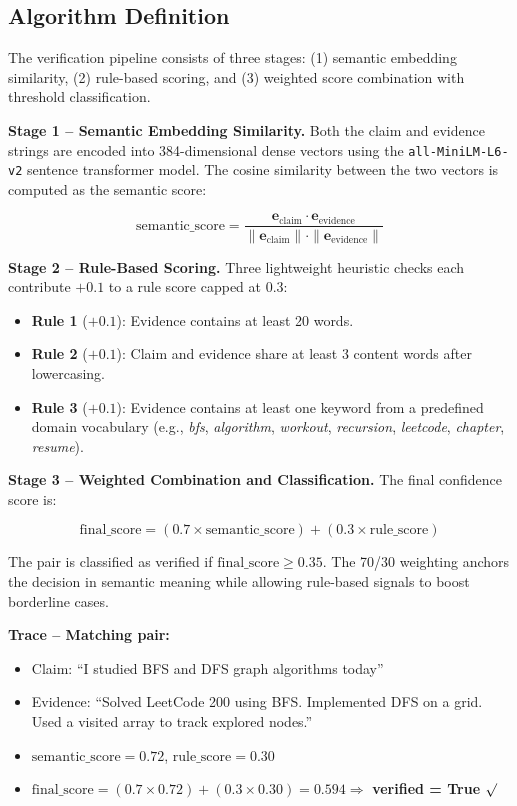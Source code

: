 \documentclass[11pt]{article}
\begin{document}
\subsection{Algorithm Definition}

The verification pipeline consists of three stages: (1) semantic embedding similarity,
(2) rule-based scoring, and (3) weighted score combination with threshold
classification.

\textbf{Stage 1 -- Semantic Embedding Similarity.} Both the claim and evidence strings
are encoded into 384-dimensional dense vectors using the \texttt{all-MiniLM-L6-v2}
sentence transformer model. The cosine similarity between the two vectors is computed
as the semantic score:

\begin{equation}
    \text{semantic\_score} = \frac{\mathbf{e}_{\text{claim}} \cdot
    \mathbf{e}_{\text{evidence}}}{\|\mathbf{e}_{\text{claim}}\| \cdot
    \|\mathbf{e}_{\text{evidence}}\|}
\end{equation}

\textbf{Stage 2 -- Rule-Based Scoring.} Three lightweight heuristic checks each
contribute $+0.1$ to a rule score capped at $0.3$:
\begin{itemize}
    \item \textbf{Rule 1} ($+0.1$): Evidence contains at least 20 words.
    \item \textbf{Rule 2} ($+0.1$): Claim and evidence share at least 3 content words
    after lowercasing.
    \item \textbf{Rule 3} ($+0.1$): Evidence contains at least one keyword from a
    predefined domain vocabulary (e.g., \textit{bfs}, \textit{algorithm},
    \textit{workout}, \textit{recursion}, \textit{leetcode}, \textit{chapter},
    \textit{resume}).
\end{itemize}

\textbf{Stage 3 -- Weighted Combination and Classification.} The final confidence
score is:

\begin{equation}
    \text{final\_score} = (0.7 \times \text{semantic\_score}) +
    (0.3 \times \text{rule\_score})
\end{equation}

The pair is classified as verified if $\text{final\_score} \geq 0.35$. The 70/30
weighting anchors the decision in semantic meaning while allowing rule-based signals
to boost borderline cases.

\textbf{Trace -- Matching pair:}
\begin{itemize}
    \item Claim: ``I studied BFS and DFS graph algorithms today''
    \item Evidence: ``Solved LeetCode 200 using BFS. Implemented DFS on a grid.
    Used a visited array to track explored nodes.''
    \item $\text{semantic\_score} = 0.72$, \quad $\text{rule\_score} = 0.30$
    \item $\text{final\_score} = (0.7 \times 0.72) + (0.3 \times 0.30) = 0.594
    \Rightarrow$ \textbf{verified = True} $\surd$
\end{itemize}
\end{document}

